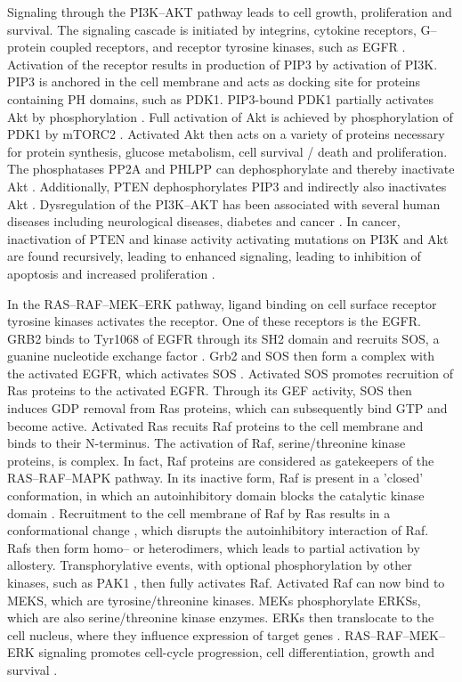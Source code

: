 {{{      Signaling through the PI3K--AKT pathway leads to cell growth,
      proliferation and survival. The signaling cascade is initiated by
      integrins, cytokine receptors, G--protein coupled
      receptors, and receptor tyrosine kinases, such as EGFR {\cite{pi3k_2}}. Activation of the
      receptor results in production of PIP3 by activation of PI3K. PIP3 is
      anchored in the cell membrane and acts as docking site for proteins
      containing PH domains, such as PDK1. PIP3-bound PDK1 partially activates
      Akt by phosphorylation {\cite{pi3k_3}}. Full activation of Akt is achieved by
      phosphorylation of PDK1 by mTORC2 {\cite{pdk1}}. Activated Akt then acts on a variety of
      proteins necessary for protein synthesis, glucose metabolism, cell
      survival / death and proliferation. The phosphatases PP2A and PHLPP can
      dephosphorylate and thereby inactivate Akt {\cite{pdk1}}. Additionally, PTEN
      dephosphorylates PIP3 and indirectly also inactivates Akt {\cite{pdk1}}. Dysregulation
      of the PI3K--AKT has been associated with several human diseases including
      neurological diseases, diabetes and cancer {\cite{akt}}. In cancer, inactivation of
      PTEN and kinase activity activating mutations on PI3K and Akt are found
      recursively, leading to enhanced signaling, leading to inhibition of
      apoptosis and increased proliferation {\cite{pi3k}}.

      In the RAS--RAF--MEK--ERK pathway, ligand binding on cell surface receptor
      tyrosine kinases activates the receptor. One of these receptors is the
      EGFR. GRB2 binds to Tyr1068 of EGFR through its SH2 domain and recruits
      SOS, a guanine nucleotide exchange factor {\cite{grb2}}. Grb2 and SOS then form a
      complex with the activated EGFR, which activates SOS {\cite{grb2}}. Activated SOS
      promotes recruition of Ras proteins to the activated EGFR. Through its GEF
      activity, SOS then induces GDP removal from Ras proteins, which can
      subsequently bind GTP and become active. Activated Ras recuits Raf
      proteins to the cell membrane and binds to their N-terminus. The
      activation of Raf, serine/threonine kinase proteins, is complex. In fact,
      Raf proteins are considered as gatekeepers of the RAS--RAF--MAPK pathway.
      In its inactive form, Raf is present in a 'closed' conformation, in which
      an autoinhibitory domain blocks the catalytic kinase domain {\cite{raf}}. Recruitment
      to the cell membrane of Raf by Ras results in a conformational change {\cite{raf_2}},
      which disrupts the autoinhibitory interaction of Raf. Rafs then form
      homo-- or heterodimers, which leads to partial activation by allostery.
      Transphorylative events, with optional phosphorylation by other kinases,
      such as PAK1 {\cite{pak1}}, then fully activates Raf. Activated Raf can now bind to
      MEKS, which are tyrosine/threonine kinases. MEKs phosphorylate ERKSs,
      which are also serine/threonine kinase enzymes. ERKs then translocate to
      the cell nucleus, where they influence expression of target genes {\cite{pak1}}.
      RAS--RAF--MEK--ERK signaling promotes cell-cycle progression, cell
      differentiation, growth and survival {\cite{pak1}}.

}}}
